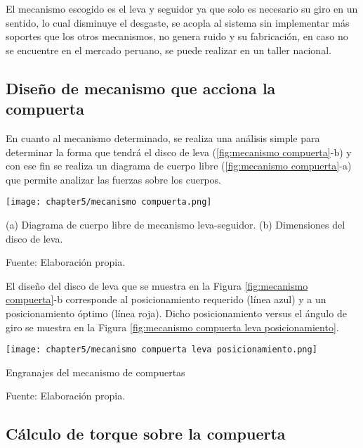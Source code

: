 El mecanismo escogido es el leva y seguidor ya que solo es necesario su giro en un sentido, lo cual disminuye el desgaste, se acopla al sistema sin implementar más soportes que los otros mecanismos, no genera ruido y su fabricación, en caso no se encuentre en el mercado peruano, se puede realizar en un taller nacional.  	

\subsection{Diseño de mecanismo que acciona la compuerta}
	
En cuanto al mecanismo determinado, se realiza una análisis simple para determinar la forma que tendrá el disco de leva (\ref{fig:mecanismo compuerta}-b) y con ese fin se realiza un diagrama de cuerpo libre (\ref{fig:mecanismo compuerta}-a) que permite analizar las fuerzas sobre los cuerpos.

\begin{myfigure}[H]
	\footnotesize\centering
	\texttt{[image: chapter5/mecanismo compuerta.png]}
	\caption[Mecanismo leva-seguidor]{(a) Diagrama de cuerpo libre de mecanismo leva-seguidor. (b) Dimensiones del disco de leva.}
	\begin{myflushcenter}
		Fuente: Elaboración propia.
	\end{myflushcenter}
	\label{fig:mecanismo compuerta}
\end{myfigure}

El diseño del disco de leva que se muestra en la Figura \ref{fig:mecanismo compuerta}-b corresponde al posicionamiento requerido (línea azul) y a un posicionamiento óptimo (línea roja). Dicho posicionamiento versus el ángulo de giro se muestra en la Figura \ref{fig:mecanismo compuerta leva posicionamiento}. 

\begin{myfigure}[H]
	\footnotesize\centering
	\texttt{[image: chapter5/mecanismo compuerta leva posicionamiento.png]}
	\caption{Engranajes del mecanismo de compuertas}
	\begin{myflushcenter}
		Fuente: Elaboración propia.
	\end{myflushcenter}
	\label{fig:mecanismo compuerta leva posicionamiento}
\end{myfigure}

\subsection{Cálculo de torque sobre la compuerta}

